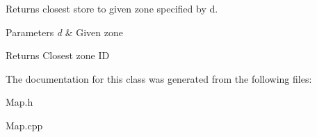 Returns closest store to given zone specified by d. 


\begin{DoxyParams}{Parameters}
{\em d} & Given zone \\
\hline
\end{DoxyParams}
\begin{DoxyReturn}{Returns}
Closest zone I\-D 
\end{DoxyReturn}


The documentation for this class was generated from the following files\-:\begin{DoxyCompactItemize}
\item 
Map.\-h\item 
Map.\-cpp\end{DoxyCompactItemize}
